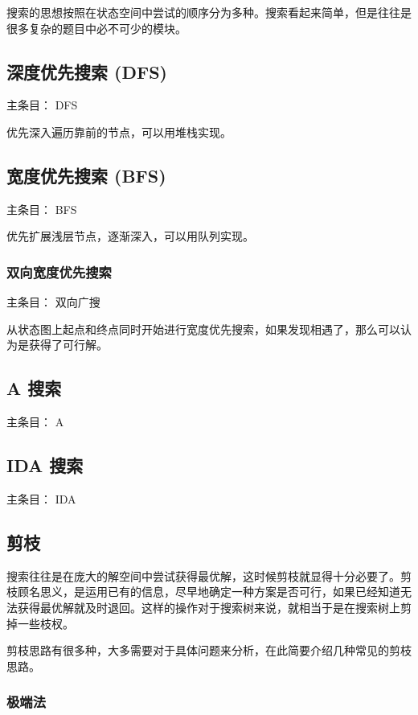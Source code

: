 
搜索的思想按照在状态空间中尝试的顺序分为多种。搜索看起来简单，但是往往是很多复杂的题目中必不可少的模块。

\subsection{深度优先搜索 (DFS)}

主条目： DFS 

优先深入遍历靠前的节点，可以用堆栈实现。

\subsection{宽度优先搜索 (BFS)}

主条目： BFS 

优先扩展浅层节点，逐渐深入，可以用队列实现。

\subsubsection{双向宽度优先搜索}

主条目： 双向广搜 

从状态图上起点和终点同时开始进行宽度优先搜索，如果发现相遇了，那么可以认为是获得了可行解。

\subsection{A 搜索}

主条目： A 

\subsection{IDA 搜索}

主条目： IDA 

\subsection{剪枝}

搜索往往是在庞大的解空间中尝试获得最优解，这时候剪枝就显得十分必要了。剪枝顾名思义，是运用已有的信息，尽早地确定一种方案是否可行，如果已经知道无法获得最优解就及时退回。这样的操作对于搜索树来说，就相当于是在搜索树上剪掉一些枝杈。

剪枝思路有很多种，大多需要对于具体问题来分析，在此简要介绍几种常见的剪枝思路。

\subsubsection{极端法}

